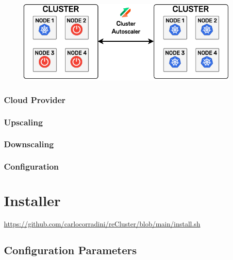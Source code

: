 \begin{figure}
  \centering
  \includegraphics[width=\linewidth]{
    images/implementation/cluster_autoscaler.pdf
  }
\end{figure}

\subsubsection{Cloud Provider}
\label{subsubsec:implementation_autoscaling_cluster_autoscaler_cloud_provider}

\subsubsection{Upscaling}
\label{subsubsec:implementation_autoscaling_cluster_autoscaler_upscaling}

\subsubsection{Downscaling}
\label{subsubsec:implementation_autoscaling_cluster_autoscaler_downscaling}

\subsubsection{Configuration}
\label{subsubsec:implementation_autoscaling_cluster_autoscaler_configuration}

\section{Installer}
\label{sec:implementation_installer}

\url{https://github.com/carlocorradini/reCluster/blob/main/install.sh}

\subsection{Configuration Parameters}
\label{subsec:implementation_installer_configuration_parameters}

